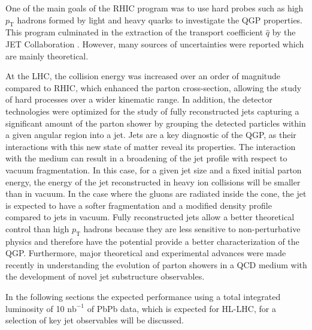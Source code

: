 

One of the main goals of the RHIC program was to use hard probes such as high $p_{\mathrm{T}}$ hadrons formed by light and heavy quarks to investigate the QGP properties. This program culminated in the extraction of the transport coefficient $\hat q $ by the JET Collaboration \cite{Burke:2013yra}. However, many sources of uncertainties were reported which are mainly theoretical. 

At the LHC, the collision energy was increased over an order of magnitude compared to RHIC, which enhanced the parton cross-section, allowing the study of hard processes over a wider kinematic range. In addition, the detector technologies were optimized for the study of fully reconstructed jets capturing a significant amount of the parton shower by grouping the detected particles within a given angular region into a jet. Jets are a key diagnostic of the QGP, as their interactions with this new state of matter reveal its properties. The interaction with the medium can result in a broadening of the jet profile with respect to vacuum fragmentation. In this case, for a given jet size and a fixed initial parton energy, the energy of the jet reconstructed in heavy ion collisions will be smaller than in vacuum. In the case where the gluons are radiated inside the cone, the jet is expected to have a softer fragmentation and a modified density profile compared to jets in vacuum. 
Fully reconstructed jets allow a better theoretical control than high $p_{\mathrm{T}}$ hadrons because they are less sensitive to non-perturbative physics and therefore have the potential provide a better characterization of the QGP. Furthermore, major theoretical and experimental advances were made recently in understanding the evolution of parton showers in a QCD medium with the development of novel jet substructure observables.

In the following sections the expected performance using a total integrated luminosity of 10 $\mathrm{nb}^{-1}$ of PbPb data, which is expected for HL-LHC, for a selection of key jet observables will be discussed. %
